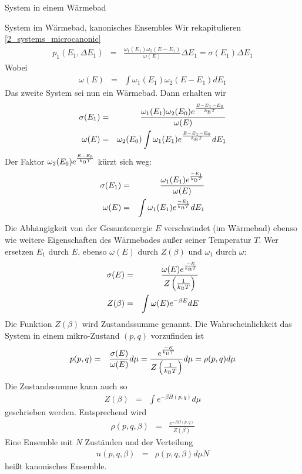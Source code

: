 \begin{chapter}{\titlestr}
\begin{section}{System in einem Wärmebad}
\begin{subsection}{System im Wärmebad, kanonisches Ensembles}
Wir rekapitulieren \ref{2_systems_microcanonic}
\begin{eqnarray*}
p_1(E_1,\Delta E_1) &=& \frac{\omega_1(E_1)\omega_2(E-E_1)}{\omega(E)}\Delta E_1=\sigma(E_1)\Delta E_1
\end{eqnarray*}
Wobei
\begin{eqnarray*}
\omega(E) &=& \int\omega_1(E_1)\omega_2(E-E_1)d E_1
\end{eqnarray*}
Das zweite System sei nun ein Wärmebad. Dann erhalten wir
\begin{eqnarray*}
\sigma(E_1)&=& \frac{\omega_1(E_1)\omega_2(E_0)e^{\frac{E-E_1-E_0}{k_{\mathrm{B}} T}}}{\omega(E)}\\
\omega(E) &=& \omega_2(E_0)\int\omega_1(E_1)e^{\frac{E-E_1-E_0}{k_{\mathrm{B}} T}}dE_1
\end{eqnarray*}
Der Faktor $\omega_2(E_0)e^{\frac{E-E_0}{k_{\mathrm{B}} T}}$ kürzt sich weg:
\begin{eqnarray*}
\sigma(E_1)&=& \frac{\omega_1(E_1)e^{\frac{-E_1}{k_{\mathrm{B}} T}}}{\omega(E)}\\
\omega(E) &=& \int\omega_1(E_1)e^{\frac{-E_1}{k_{\mathrm{B}} T}}dE_1
\end{eqnarray*}
Die Abhängigkeit von der Gesamtenergie $E$ verschwindet (im Wärmebad)
ebenso wie weitere Eigenschaften des Wärmebades außer seiner Temperatur $T$.
Wer ersetzen $E_1$ durch $E$, ebenso $\omega(E)$  durch $Z(\beta)$ und $\omega_1$ durch $\omega$:
\begin{eqnarray}
\label{sigma_E_canonic}
\sigma(E)&=& \frac{\omega(E)e^{\frac{-E}{k_{\mathrm{B}} T}}}{Z\left(\frac{1}{k_{\mathrm{B}} T}\right)}\\
Z(\beta) &=& \int\omega(E)e^{-\beta E}dE
\end{eqnarray}
Die Funktion $Z(\beta)$ wird Zustandssumme genannt. Die Wahrscheinlichkeit das System in einem mikro-Zustand
$(p,q)$ vorzufinden ist
\begin{eqnarray*}
p(p,q) &=& \frac{\sigma(E)}{\omega(E)}d\mu = \frac{e^{\frac{-E}{k_{\mathrm{B}} T}}}{Z\left(\frac{1}{k_{\mathrm{B}} T}\right)}d\mu
=\rho(p,q)d\mu
\end{eqnarray*}
Die Zustandssumme kann auch so
\begin{eqnarray*}
Z(\beta) &=& \int e^{-\beta H(p,q)}d\mu
\end{eqnarray*}
geschrieben werden. Entsprechend wird
\begin{eqnarray}
\label{rho_beta_canonic}
\rho(p,q,\beta) &=& \frac{e^{-\beta H(p,q)}}{Z(\beta)}
\end{eqnarray}
Eine Ensemble mit $N$ Zuständen und der Verteilung
\begin{eqnarray*}
n(p,q,\beta) &=& \rho(p,q,\beta)d\mu N
\end{eqnarray*}
heißt kanonisches Ensemble.
\end{subsection}


\end{section}
\end{chapter}
